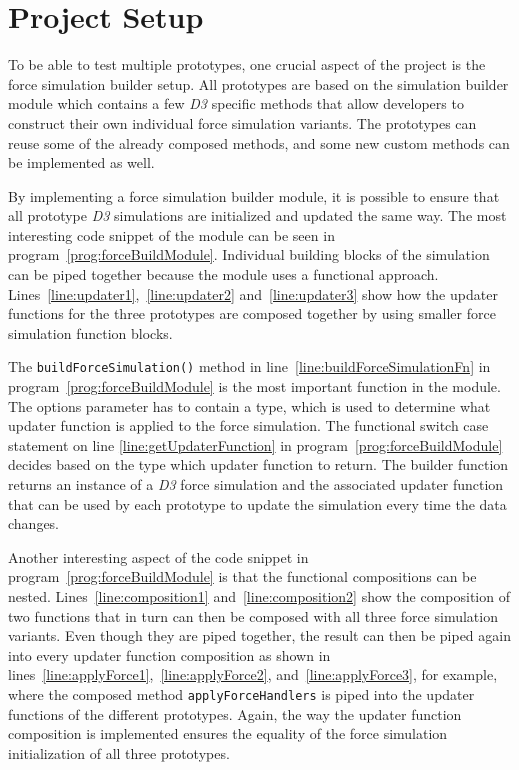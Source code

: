 \section{Project Setup}
\label{sub:projectSetup}

To be able to test multiple prototypes, one crucial aspect of the project is the force simulation builder setup. All prototypes are based on the simulation builder module which contains a few \emph{D3} specific methods that allow developers to construct their own individual force simulation variants. The prototypes can reuse some of the already composed methods, and some new custom methods can be implemented as well.

By implementing a force simulation builder module, it is possible to ensure that all prototype \emph{D3} simulations are initialized and updated the same way. The most interesting code snippet of the module can be seen in program~\ref{prog:forceBuildModule}. Individual building blocks of the simulation can be piped together because the module uses a functional approach. Lines~\ref{line:updater1},~\ref{line:updater2} and~\ref{line:updater3} show how the updater functions for the three prototypes are composed together by using smaller force simulation function blocks.

The \texttt{buildForceSimulation()} method in line~\ref{line:buildForceSimulationFn} in program~\ref{prog:forceBuildModule} is the most important function in the module. The options parameter has to contain a type, which is used to determine what updater function is applied to the force simulation. The functional switch case statement on line \ref{line:getUpdaterFunction} in program~\ref{prog:forceBuildModule} decides based on the type which updater function to return. The builder function returns an instance of a \emph{D3} force simulation and the associated updater function that can be used by each prototype to update the simulation every time the data changes.

Another interesting aspect of the code snippet in program~\ref{prog:forceBuildModule} is that the functional compositions can be nested. Lines~\ref{line:composition1} and~\ref{line:composition2} show the composition of two functions that in turn can then be composed with all three force simulation variants. Even though they are piped together, the result can then be piped again into every updater function composition as shown in lines~\ref{line:applyForce1},~\ref{line:applyForce2}, and~\ref{line:applyForce3}, for example, where the composed method \texttt{applyForceHandlers} is piped into the updater functions of the different prototypes. Again, the way the updater function composition is implemented ensures the equality of the force simulation initialization of all three prototypes.

